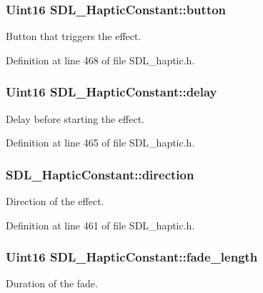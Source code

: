 \hypertarget{structSDL__HapticConstant_aa65321f1b002adaab6e629d5bed556e9}{
\subsubsection[{button}]{\setlength{\rightskip}{0pt plus 5cm}Uint16 S\+D\+L\+\_\+\+Haptic\+Constant\+::button}}\label{structSDL__HapticConstant_aa65321f1b002adaab6e629d5bed556e9}
Button that triggers the effect. 

Definition at line 468 of file S\+D\+L\+\_\+haptic.\+h.

\hypertarget{structSDL__HapticConstant_a16a751009893f5412201e3ce91146b25}{
\subsubsection[{delay}]{\setlength{\rightskip}{0pt plus 5cm}Uint16 S\+D\+L\+\_\+\+Haptic\+Constant\+::delay}}\label{structSDL__HapticConstant_a16a751009893f5412201e3ce91146b25}
Delay before starting the effect. 

Definition at line 465 of file S\+D\+L\+\_\+haptic.\+h.

\hypertarget{structSDL__HapticConstant_a3e871debf4e57c35960f019d2605d84f}{
\subsubsection[{direction}]{ S\+D\+L\+\_\+\+Haptic\+Constant\+::direction}}\label{structSDL__HapticConstant_a3e871debf4e57c35960f019d2605d84f}
Direction of the effect. 

Definition at line 461 of file S\+D\+L\+\_\+haptic.\+h.

\hypertarget{structSDL__HapticConstant_a647a6b761ac6ba16160d0892a12806bc}{
\subsubsection[{fade\+\_\+length}]{\setlength{\rightskip}{0pt plus 5cm}Uint16 S\+D\+L\+\_\+\+Haptic\+Constant\+::fade\+\_\+length}}\label{structSDL__HapticConstant_a647a6b761ac6ba16160d0892a12806bc}
Duration of the fade. 

